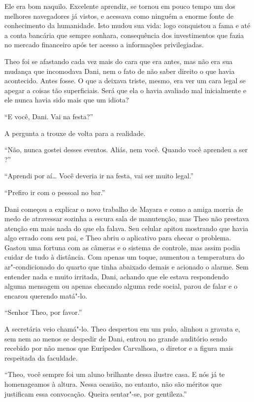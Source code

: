 Ele era bom naquilo. Excelente aprendiz, se tornou em pouco tempo um dos melhores
navegadores já vistos, e acessava como ninguém
a enorme fonte de conhecimento da humanidade. Isto mudou sua vida: logo
conquistou a fama e até a conta bancária que sempre sonhara,
consequência dos investimentos que fazia no mercado financeiro após ter
acesso a informações privilegiadas.

Theo foi se afastando cada vez mais do cara que era antes, mas não era
sua mudança que incomodava Dani, nem o fato de não saber direito o que
havia acontecido. Antes fosse. O que a deixava triste, mesmo, era ver um
cara legal se apegar a coisas tão superficiais. Será que ela o havia
avaliado mal inicialmente e ele nunca havia sido mais que um idiota?

``E você, Dani. Vai na festa?''

A pergunta a trouxe de volta para a realidade.

``Não, nunca gostei desses eventos. Aliás, nem você. Quando você
aprendeu a ser ?''

``Aprendi por aí\ldots{} Você deveria ir na festa, vai ser muito
legal.''

``Prefiro ir com o pessoal no bar.''

Dani começou a explicar o novo trabalho de Mayara e como a amiga morria
de medo de atravessar sozinha a escura sala de manutenção, mas Theo não
prestava atenção em mais nada do que ela falava. Seu celular apitou
mostrando que havia algo errado com seu pai, e Theo abriu o aplicativo
para checar o problema. Gastou uma fortuna com as câmeras e o sistema de
controle, mas assim podia cuidar de tudo à distância. Com apenas um
toque, aumentou a temperatura do ar"-condicionado do quarto que tinha
abaixado demais e acionado o alarme. Sem entender nada e muito irritada,
Dani, achando que ele estava respondendo alguma mensagem ou apenas
checando alguma rede social, parou de falar e o encarou querendo
matá"-lo.

``Senhor Theo, por favor.''

A secretária veio chamá"-lo. Theo despertou em um pulo, alinhou a gravata
e, sem nem ao menos se despedir de Dani, entrou no grande auditório
sendo recebido por não menos que Eurípedes Carvalhosa, o diretor e a
figura mais respeitada da faculdade.

``Theo, você sempre foi um aluno brilhante dessa ilustre casa. E nós já
te homenageamos à altura. Nessa ocasião, no entanto, não são méritos que
justificam essa convocação. Queira sentar"-se, por gentileza.''


